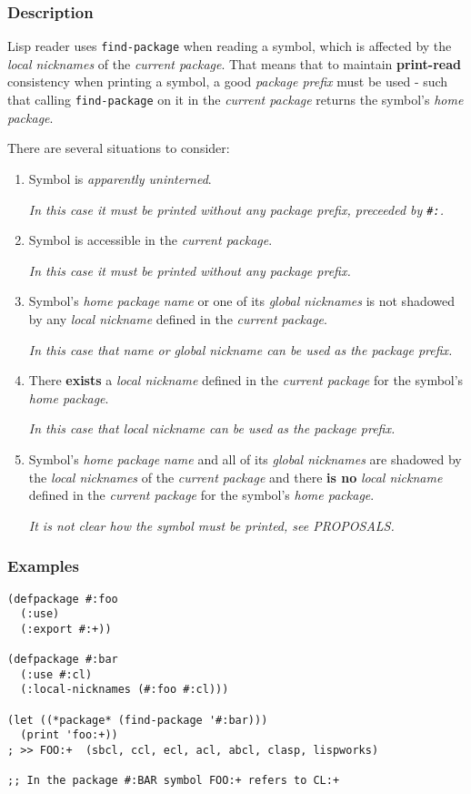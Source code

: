 \documentclass[11pt]{article}
\begin{document}
\subsubsection{Description}
\label{sec:org9bd2262}
Lisp reader uses \texttt{find-package} when reading a symbol, which is affected by the
\emph{local nicknames} of the \emph{current package}. That means that to maintain \textbf{print-read}
consistency when printing a symbol, a good \emph{package prefix} must be used - such that
calling \texttt{find-package} on it in the \emph{current package} returns the symbol's \emph{home
package}.

There are several situations to consider:
\begin{enumerate}
\item Symbol is \emph{apparently uninterned}.

\emph{In this case it must be printed without any package prefix, preceeded by \texttt{\#:}.}

\item Symbol is accessible in the \emph{current package}.

\emph{In this case it must be printed without any package prefix.}

\item Symbol's \emph{home package} \emph{name} or one of its \emph{global nicknames} is not shadowed
by any \emph{local nickname} defined in the \emph{current package}.

\emph{In this case that name or global nickname can be used as the package prefix.}

\item There \textbf{exists} a \emph{local nickname} defined in the \emph{current package} for the
symbol's \emph{home package}.

\emph{In this case that local nickname can be used as the package prefix.}

\item Symbol's \emph{home package} \emph{name} and all of its \emph{global nicknames} are shadowed by
the \emph{local nicknames} of the \emph{current package} and there \textbf{is no} \emph{local nickname}
defined in the \emph{current package} for the symbol's \emph{home package}.

\emph{It is not clear how the symbol must be printed, see PROPOSALS.}
\end{enumerate}
\subsubsection{Examples}
\label{sec:org2568312}
\begin{verbatim}
(defpackage #:foo
  (:use)
  (:export #:+))

(defpackage #:bar
  (:use #:cl)
  (:local-nicknames (#:foo #:cl)))

(let ((*package* (find-package '#:bar)))
  (print 'foo:+))
; >> FOO:+  (sbcl, ccl, ecl, acl, abcl, clasp, lispworks)

;; In the package #:BAR symbol FOO:+ refers to CL:+
\end{verbatim}
\end{document}
